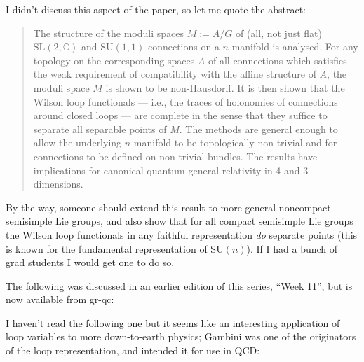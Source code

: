 \documentclass[12pt]{article}
\def\tightlist{}
\renewcommand{\texttt}[1]{%
  \begingroup
  \ttfamily
  \begingroup\lccode`~=`/\lowercase{\endgroup\def~}{/\discretionary{}{}{}}%
  \begingroup\lccode`~=`[\lowercase{\endgroup\def~}{[\discretionary{}{}{}}%
  \begingroup\lccode`~=`.\lowercase{\endgroup\def~}{.\discretionary{}{}{}}%
  \catcode`/=\active\catcode`[=\active\catcode`.=\active
  \scantokens{#1\noexpand}%
  \endgroup
}
\begin{document}
I didn't discuss this aspect of the paper, so let me quote the abstract:

\begin{quote}
The structure of the moduli spaces \(M := A/G\) of (all, not just flat)
\(\mathrm{SL}(2,\mathbb{C})\) and \(\mathrm{SU}(1,1)\) connections on a
\(n\)-manifold is analysed. For any topology on the corresponding spaces
\(A\) of all connections which satisfies the weak requirement of
compatibility with the affine structure of \(A\), the moduli space \(M\)
is shown to be non-Hausdorff. It is then shown that the Wilson loop
functionals --- i.e., the traces of holonomies of connections around
closed loops --- are complete in the sense that they suffice to separate
all separable points of \(M\). The methods are general enough to allow
the underlying \(n\)-manifold to be topologically non-trivial and for
connections to be defined on non-trivial bundles. The results have
implications for canonical quantum general relativity in 4 and 3
dimensions.
\end{quote}

By the way, someone should extend this result to more general noncompact
semisimple Lie groups, and also show that for all compact semisimple Lie
groups the Wilson loop functionals in any faithful representation
\emph{do} separate points (this is known for the fundamental
representation of \(\mathrm{SU}(n)\)). If I had a bunch of grad students
I would get one to do so.

The following was discussed in an earlier edition of this series,
\protect\hyperlink{week11}{``Week 11''}, but is now available from
gr-qc:


I haven't read the following one but it seems like an interesting
application of loop variables to more down-to-earth physics; Gambini was
one of the originators of the loop representation, and intended it for
use in QCD:

\end{document}
